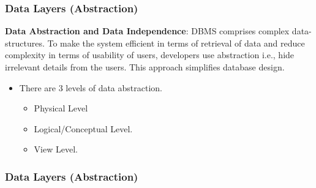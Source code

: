 \begin{frame}
	\frametitle{Data Layers (Abstraction)}
	\begin{definition}
		\textbf{Data Abstraction and Data Independence}: DBMS comprises complex data-structures. To make the system efficient in terms of retrieval of data and reduce complexity in terms of usability of users, developers use abstraction i.e., hide irrelevant details from the users. This approach simplifies database design.
	\end{definition}	
	\begin{itemize}[<+->]
		\item There are 3 levels of data abstraction.
		\begin{itemize}[<+->]
			\item Physical Level
			\item Logical/Conceptual Level.
			\item View Level.
		\end{itemize}
	\end{itemize}	
\end{frame}
\begin{frame}
	\frametitle{Data Layers (Abstraction)}
	


\end{frame}

